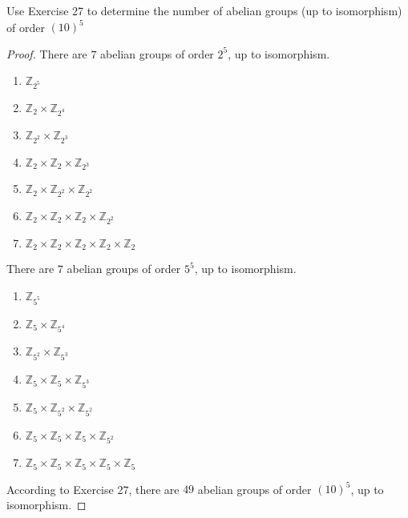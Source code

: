 \newpage
\begin{exercise}
    Use Exercise 27 to determine the number of abelian groups (up to isomorphism) of order ${(10)}^{5}$
\end{exercise}

\begin{proof}
    There are $7$ abelian groups of order $2^{5}$, up to isomorphism.
    \begin{enumerate}
        \item $\mathbb{Z}_{2^{5}}$
        \item $\mathbb{Z}_{2} \times \mathbb{Z}_{2^{4}}$
        \item $\mathbb{Z}_{2^{2}} \times \mathbb{Z}_{2^{3}}$
        \item $\mathbb{Z}_{2} \times \mathbb{Z}_{2} \times \mathbb{Z}_{2^{3}}$
        \item $\mathbb{Z}_{2} \times \mathbb{Z}_{2^{2}} \times \mathbb{Z}_{2^{2}}$
        \item $\mathbb{Z}_{2} \times \mathbb{Z}_{2} \times \mathbb{Z}_{2} \times \mathbb{Z}_{2^{2}}$
        \item $\mathbb{Z}_{2} \times \mathbb{Z}_{2} \times \mathbb{Z}_{2} \times \mathbb{Z}_{2} \times \mathbb{Z}_{2}$
    \end{enumerate}

    There are $7$ abelian groups of order $5^{5}$, up to isomorphism.
    \begin{enumerate}
        \item $\mathbb{Z}_{5^{5}}$
        \item $\mathbb{Z}_{5} \times \mathbb{Z}_{5^{4}}$
        \item $\mathbb{Z}_{5^{2}} \times \mathbb{Z}_{5^{3}}$
        \item $\mathbb{Z}_{5} \times \mathbb{Z}_{5} \times \mathbb{Z}_{5^{3}}$
        \item $\mathbb{Z}_{5} \times \mathbb{Z}_{5^{2}} \times \mathbb{Z}_{5^{2}}$
        \item $\mathbb{Z}_{5} \times \mathbb{Z}_{5} \times \mathbb{Z}_{5} \times \mathbb{Z}_{5^{2}}$
        \item $\mathbb{Z}_{5} \times \mathbb{Z}_{5} \times \mathbb{Z}_{5} \times \mathbb{Z}_{5} \times \mathbb{Z}_{5}$
    \end{enumerate}

    According to Exercise 27, there are $49$ abelian groups of order ${(10)}^{5}$, up to isomorphism.
\end{proof}

